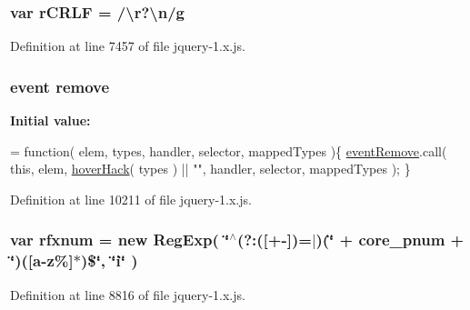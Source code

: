 \subsubsection[{\texorpdfstring{r\+C\+R\+LF}{rCRLF}}]{\setlength{\rightskip}{0pt plus 5cm}var r\+C\+R\+LF = /\textbackslash{}r?\textbackslash{}{\bf n}/{\bf g}}\hypertarget{jquery-1_8x_8js_a4fd9dfc4eb645b441a3e84730c50154b}{}\label{jquery-1_8x_8js_a4fd9dfc4eb645b441a3e84730c50154b}


Definition at line 7457 of file jquery-\/1.\+x.\+js.

\subsubsection[{\texorpdfstring{remove}{remove}}]{ event remove}\hypertarget{jquery-1_8x_8js_ac2bfeac9f445211e9176a527d3a292c4}{}\label{jquery-1_8x_8js_ac2bfeac9f445211e9176a527d3a292c4}
{\bfseries Initial value\+:}
\begin{DoxyCode}
= \textcolor{keyword}{function}( elem, types, handler, selector, mappedTypes )\{
    \hyperlink{jquery-1_8x_8js_a818e9517d5b1b7b7e05391ea8ff1dfd5}{eventRemove}.call( \textcolor{keyword}{this}, elem, \hyperlink{jquery-1_8x_8js_a645cef4bdf3fc1881c5272dacddb8917}{hoverHack}( types ) || \textcolor{stringliteral}{""}, handler, selector, 
      mappedTypes );
\}
\end{DoxyCode}


Definition at line 10211 of file jquery-\/1.\+x.\+js.

\subsubsection[{\texorpdfstring{rfxnum}{rfxnum}}]{\setlength{\rightskip}{0pt plus 5cm}var rfxnum = new Reg\+Exp( \char`\"{}$^\wedge$(?\+:(\mbox{[}+-\/\mbox{]})=$\vert$)(\char`\"{} + core\+\_\+pnum + \char`\"{})(\mbox{[}a-\/z\%\mbox{]}$\ast$)\$\char`\"{}, \char`\"{}{\bf i}\char`\"{} )}\hypertarget{jquery-1_8x_8js_a7907e208847275b29993c85031275f9f}{}\label{jquery-1_8x_8js_a7907e208847275b29993c85031275f9f}


Definition at line 8816 of file jquery-\/1.\+x.\+js.

